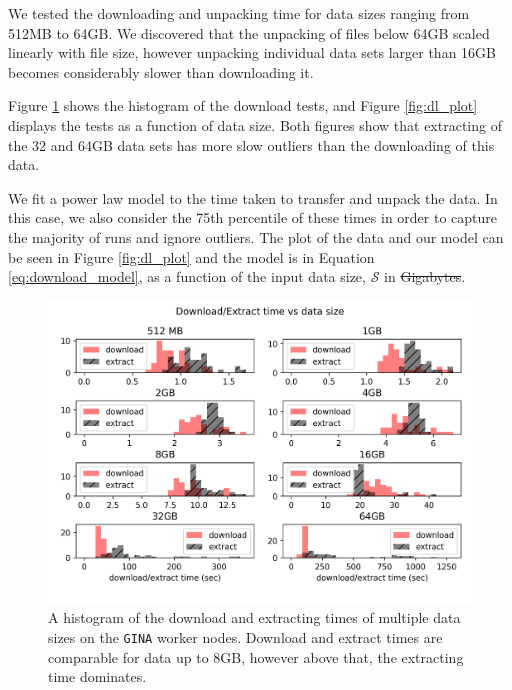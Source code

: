 \documentclass[preprint,5p]{elsarticle}
\providecommand{\DIFadd}[1]{{\protect\color{blue}\uwave{#1}}} %
\providecommand{\DIFdel}[1]{{\protect\color{red}\sout{#1}}}                      %
\providecommand{\DIFaddbegin}{} %
\providecommand{\DIFaddend}{} %
\providecommand{\DIFdelbegin}{} %
\providecommand{\DIFdelend}{} %
\newcommand{\DIFscaledelfig}{0.5}
\newlength{\DIFdelgraphicswidth} %
\newlength{\DIFdelgraphicsheight} %
\newcommand{\DIFaddincludegraphics}[2][]{{\color{blue}\fbox{\DIFOincludegraphics[#1]{#2}}}} %
\newcommand{\DIFdelincludegraphics}[2][]{%
\sbox{\DIFdelgraphicsbox}{\DIFOincludegraphics[#1]{#2}}%
\settoboxwidth{\DIFdelgraphicswidth}{\DIFdelgraphicsbox} %
\settoboxtotalheight{\DIFdelgraphicsheight}{\DIFdelgraphicsbox} %
\scalebox{\DIFscaledelfig}{%
\parbox[b]{\DIFdelgraphicswidth}{\usebox{\DIFdelgraphicsbox}\\[-\baselineskip] \rule{\DIFdelgraphicswidth}{0em}}\llap{\resizebox{\DIFdelgraphicswidth}{\DIFdelgraphicsheight}{%
\setlength{\unitlength}{\DIFdelgraphicswidth}%
\begin{picture}(1,1)%
\thicklines\linethickness{2pt} %
{\color[rgb]{1,0,0}\put(0,0){\framebox(1,1){}}}%
{\color[rgb]{1,0,0}\put(0,0){\line( 1,1){1}}}%
{\color[rgb]{1,0,0}\put(0,1){\line(1,-1){1}}}%
\end{picture}%
}\hspace*{3pt}}} %
} %
\DeclareRobustCommand{\DIFaddbegin}{\DIFOaddbegin \let\includegraphics\DIFaddincludegraphics} %
\DeclareRobustCommand{\DIFaddend}{\DIFOaddend \let\includegraphics\DIFOincludegraphics} %
\DeclareRobustCommand{\DIFdelbegin}{\DIFOdelbegin \let\includegraphics\DIFdelincludegraphics} %
\DeclareRobustCommand{\DIFdelend}{\DIFOaddend \let\includegraphics\DIFOincludegraphics} %
\begin{document}
We tested the downloading and unpacking time for data sizes ranging from 512MB to 64GB. We discovered that the unpacking of files below 64GB scaled linearly with file size, however unpacking individual data sets larger than 16GB becomes considerably slower than downloading it. 

Figure \ref{fig:dl_hist} shows the histogram of the download tests, and Figure \ref{fig:dl_plot} displays the tests as a function of data size. Both figures show that extracting of the 32 and 64GB data sets has more slow outliers than the downloading of this data. 

We fit a power law model to the time taken to transfer and unpack the data. In this case, we also consider the 75th percentile of these times in order to capture the majority of runs and ignore outliers. The plot of the data and our model can be seen in Figure \ref{fig:dl_plot} and the model is in Equation \ref{eq:download_model}, as a function of the input data size,
$\mathcal{S} $ in \DIFdelbegin \DIFdel{Gigabytes}\DIFdelend \DIFaddbegin \DIFadd{gigabytes}\DIFaddend .

\begin{figure}
    \includegraphics[width=0.95\linewidth]{figures/dl_ex_hatched.png}
      \caption{A histogram of the download and extracting times of multiple data sizes on the \texttt{GINA} worker nodes. Download and extract times are comparable for data up to 8GB, however above that, the extracting time dominates.  }
	\label{fig:dl_hist}
\end{figure}
\end{document}
